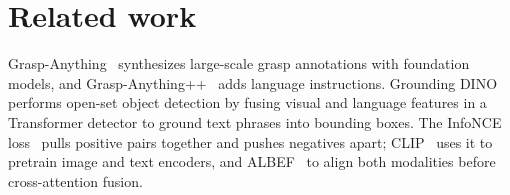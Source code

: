 \section{Related work}
\label{sec:related}

Grasp-Anything~\cite{vuong2023grasp} synthesizes large-scale grasp annotations with foundation models, and Grasp-Anything++~\cite{vuong2024language} adds language instructions.
Grounding DINO~\cite{liu2024grounding} performs open-set object detection by fusing visual and language features in a Transformer detector to ground text phrases into bounding boxes.
The InfoNCE loss~\cite{oord2018cpc} pulls positive pairs together and pushes negatives apart; CLIP~\cite{radford2021clip} uses it to pretrain image and text encoders, and ALBEF~\cite{li2021albef} to align both modalities before cross-attention fusion.
